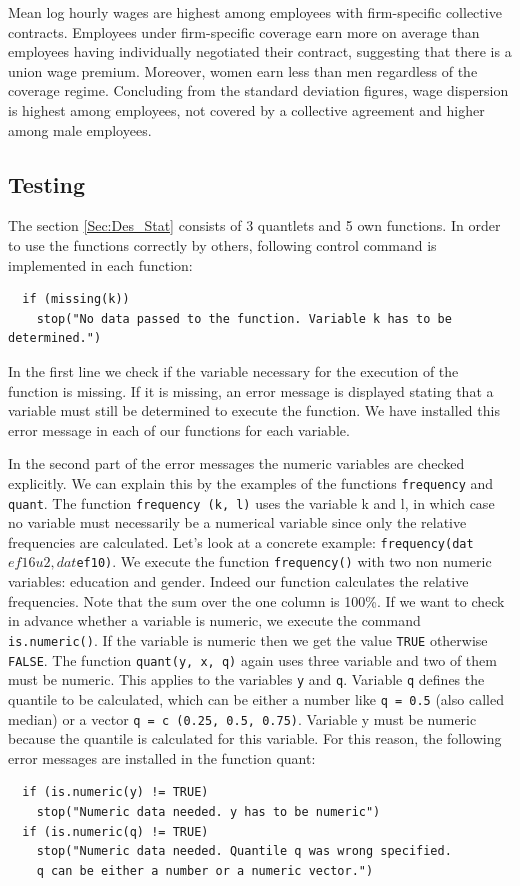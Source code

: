 Mean log hourly wages are highest among employees with firm-specific collective contracts. Employees under firm-specific coverage earn more on average than employees having individually negotiated their contract, suggesting that there is a union wage premium. Moreover, women earn less than men regardless of the coverage regime. Concluding from the standard deviation figures, wage dispersion is highest among employees, not covered by a collective agreement and higher among male employees.

\subsection{Testing}

The section \ref{Sec:Des_Stat} consists of 3 quantlets and 5 own functions. In order to use the functions correctly by others, following control command is implemented in each function:
\lstset{firstnumber = 162} 
\begin{lstlisting}
  if (missing(k))
    stop("No data passed to the function. Variable k has to be determined.")
\end{lstlisting}
In the first line we check if the variable necessary for the execution of the function is missing. If it is missing, an error message is displayed stating that a variable must still be determined to execute the function. We have installed this error message in each of our functions for each variable.

In the second part of the error messages the numeric variables are checked explicitly. We can explain this by the examples of the functions \texttt{frequency} and \texttt{quant}. The function \texttt{frequency (k, l)} uses the variable k and l, in which case no variable must necessarily be a numerical variable since only the relative frequencies are calculated. Let's look at a concrete example: \texttt{frequency(dat$ef16u2, dat$ef10)}. We execute the function \texttt{frequency()} with two non numeric variables: education and gender. Indeed our function calculates the relative frequencies. Note that the sum over the one column is 100\%. If we want to check in advance whether a variable is numeric, we execute the command \texttt{is.numeric()}. If the variable is numeric then we get the value \texttt{TRUE} otherwise \texttt{FALSE}. The function \texttt{quant(y, x, q)} again uses three variable and two of them must be numeric. This applies to the variables \texttt{y} and \texttt{q}. Variable \texttt{q} defines the quantile to be calculated, which can be either a number like \texttt{q = 0.5} (also called median) or a vector \texttt{q = c (0.25, 0.5, 0.75)}. Variable y must be numeric because the quantile is calculated for this variable. For this reason, the following error messages are installed in the function quant:
\lstset{firstnumber = 262} 
\begin{lstlisting}
  if (is.numeric(y) != TRUE)
    stop("Numeric data needed. y has to be numeric")
  if (is.numeric(q) != TRUE)
    stop("Numeric data needed. Quantile q was wrong specified.
    q can be either a number or a numeric vector.")
\end{lstlisting}

